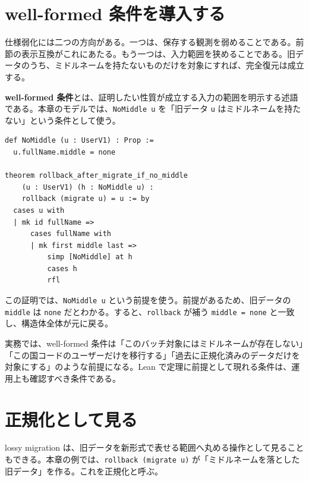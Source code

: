 \section{well-formed 条件を導入する}

仕様弱化には二つの方向がある。一つは、保存する観測を弱めることである。前節の表示互換がこれにあたる。もう一つは、入力範囲を狭めることである。旧データのうち、ミドルネームを持たないものだけを対象にすれば、完全復元は成立する。

\begin{definitionbox}
\textbf{well-formed 条件}とは、証明したい性質が成立する入力の範囲を明示する述語である。本章のモデルでは、\texttt{NoMiddle u} を「旧データ \texttt{u} はミドルネームを持たない」という条件として使う。
\end{definitionbox}

\begin{listing}[htbp]
\begin{verbatim}
def NoMiddle (u : UserV1) : Prop :=
  u.fullName.middle = none

theorem rollback_after_migrate_if_no_middle
    (u : UserV1) (h : NoMiddle u) :
    rollback (migrate u) = u := by
  cases u with
  | mk id fullName =>
      cases fullName with
      | mk first middle last =>
          simp [NoMiddle] at h
          cases h
          rfl
\end{verbatim}
\caption{well-formed な旧データに限れば完全復元できる}
\label{lst:ch23-wellformed}
\end{listing}

この証明では、\texttt{NoMiddle u} という前提を使う。前提があるため、旧データの \texttt{middle} は \texttt{none} だとわかる。すると、\texttt{rollback} が補う \texttt{middle = none} と一致し、構造体全体が元に戻る。

\begin{softwarebox}
実務では、well-formed 条件は「このバッチ対象にはミドルネームが存在しない」「この国コードのユーザーだけを移行する」「過去に正規化済みのデータだけを対象にする」のような前提になる。Lean で定理に前提として現れる条件は、運用上も確認すべき条件である。
\end{softwarebox}

\section{正規化として見る}

lossy migration は、旧データを新形式で表せる範囲へ丸める操作として見ることもできる。本章の例では、\texttt{rollback (migrate u)} が「ミドルネームを落とした旧データ」を作る。これを正規化と呼ぶ。

